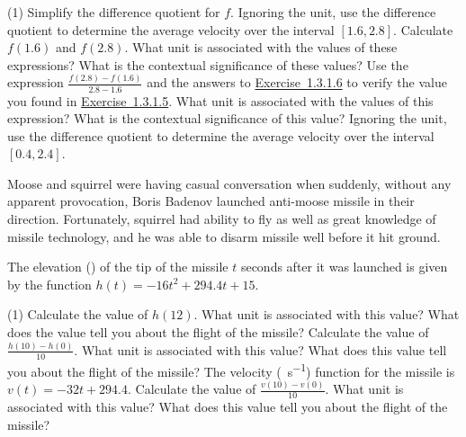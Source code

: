 \documentclass[12pt,]{book}
\theoremstyle{plain}
\theoremstyle{definition}
\theoremstyle{definition}
\theoremstyle{definition}
\theoremstyle{definition}
\theoremstyle{definition}
\numberwithin{equation}{section}
\newcommand{\fe}[2]{#1\mathopen{}\left(#2\right)\mathclose{}}
\newcommand{\cinterval}[2]{\left[#1,#2\right]}
\begin{document}
\begin{exercisegroup}(1)
\exercise[4.]\hypertarget{exercise-12}{}Simplify the difference quotient for \(f\).%
\exercise[5.]\hypertarget{exercise-difference-quotient-average-velocity}{}Ignoring the unit, use the difference quotient to determine the average velocity over the interval \(\cinterval{1.6}{2.8}\).%
\exercise[6.]\hypertarget{exercise-difference-quotient-values}{}Calculate \(\fe{f}{1.6}\) and \(\fe{f}{2.8}\). What unit is associated with the values of these expressions? What is the contextual significance of these values?%
\exercise[7.]\hypertarget{exercise-difference-quotient-verify}{}Use the expression \(\frac{\fe{f}{2.8}-\fe{f}{1.6}}{2.8-1.6}\) and the answers to \hyperlink{exercise-difference-quotient-values}{Exercise~1.3.1.6} to verify the value you found in \hyperlink{exercise-difference-quotient-average-velocity}{Exercise~1.3.1.5}. What unit is associated with the values of this expression? What is the contextual significance of this value?%
\exercise[8.]\hypertarget{exercise-16}{}Ignoring the unit, use the difference quotient to determine the average velocity over the interval \(\cinterval{0.4}{2.4}\).%
\end{exercisegroup}
\par\smallskip\noindent
\hypertarget{exercisegroup-5}{}\par\noindent Moose and squirrel were having casual conversation when suddenly, without any apparent provocation, Boris Badenov launched anti-moose missile in their direction. Fortunately, squirrel had ability to fly as well as great knowledge of missile technology, and he was able to disarm missile well before it hit ground.%
\par
The elevation (\si{\foot}) of the tip of the missile \(t\) seconds after it was launched is given by the function \(\fe{h}{t}=-16t^2+294.4t+15\).%
\begin{exercisegroup}(1)
\exercise[9.]\hypertarget{exercise-17}{}Calculate the value of \(\fe{h}{12}\). What unit is associated with this value? What does the value tell you about the flight of the missile?%
\exercise[10.]\hypertarget{exercise-18}{}Calculate the value of \(\frac{\fe{h}{10}-\fe{h}{0}}{10}\). What unit is associated with this value? What does this value tell you about the flight of the missile?%
\exercise[11.]\hypertarget{exercise-19}{}The velocity (\si{\foot\per\second}) function for the missile is \(\fe{v}{t}=-32t+294.4\). Calculate the value of \(\frac{\fe{v}{10}-\fe{v}{0}}{10}\). What unit is associated with this value? What does this value tell you about the flight of the missile?%
\end{exercisegroup}
\end{document}
